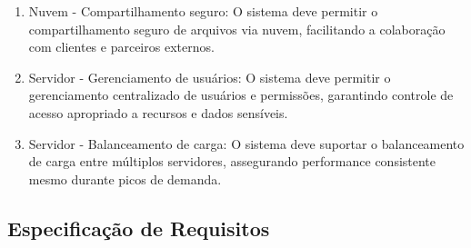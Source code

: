 \begin{enumerate}
  \item Nuvem - Compartilhamento seguro: O sistema deve permitir o compartilhamento seguro de arquivos via nuvem, facilitando a colaboração com clientes e parceiros externos.
  \item Servidor - Gerenciamento de usuários: O sistema deve permitir o gerenciamento centralizado de usuários e permissões, garantindo controle de acesso apropriado a recursos e dados sensíveis.
  \item Servidor - Balanceamento de carga: O sistema deve suportar o balanceamento de carga entre múltiplos servidores, assegurando performance consistente mesmo durante picos de demanda.
\end{enumerate}

\subsection{Especificação de Requisitos}

